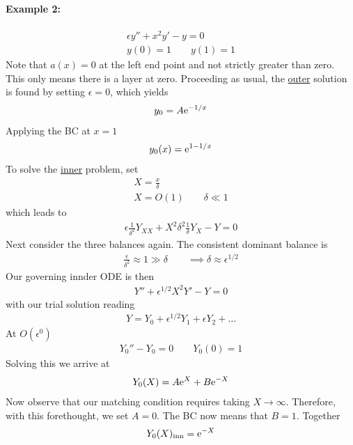 \paragraph{Example 2:} 
\begin{gather*}
	\epsilon y'' + x^2 y' - y =0 \\
	y(0) = 1 \qquad y(1) = 1
\end{gather*}
Note that $a(x)=0$ at the left end point and not strictly greater than zero. This only means there is a layer at zero. Proceeding as usual, the \underline{outer} solution is found by setting $\epsilon=0$, which yields
\begin{gather*}
	y_0 = A \mathrm{e}^{-1/x}
\end{gather*}
Applying the BC at $x=1$
\begin{gather*}
	y_0(x) = \mathrm{e}^{1-1/x}
\end{gather*}
To solve the \underline{inner} problem, set
\begin{gather*}
	X = \frac{x}{\delta} \\
	X = O(1) \qquad \delta \ll 1
\end{gather*}
which leads to
\begin{gather*}
	\epsilon \frac{1}{\delta^2} Y_{XX} + X^2 \delta^2 \frac{1}{\delta}Y_X - Y = 0
\end{gather*}
Next consider the three balances again. The consistent dominant balance is
\begin{gather*}
	\frac{\epsilon}{\delta^2} \approx 1 \gg \delta \qquad 
	\implies \delta \approx \epsilon^{1/2}
\end{gather*}
Our governing innder ODE is then
\begin{gather*}
	Y'' + \epsilon^{1/2}X^2 Y' - Y = 0
\end{gather*}
with our trial solution reading
\begin{gather*}
	Y = Y_0 + \epsilon^{1/2} Y_1 + \epsilon Y_2 + \dots 
\end{gather*}
At $O(\epsilon^0)$
\begin{gather*}
	Y_0 '' - Y_0 = 0 \qquad Y_0(0) = 1
\end{gather*}
Solving this we arrive at
\begin{gather*}
	Y_0(X) = A \mathrm{e}^{X} + B\mathrm{e}^{-X}
\end{gather*}
Now observe that our matching condition requires taking $X \rightarrow \infty$. Therefore, with this forethought, we set $A=0$. The BC now means that $B=1$. Together
\begin{gather*}
	Y_0(X)_\text{inn} = \mathrm{e}^{-X}
\end{gather*}
